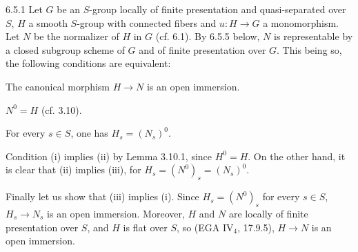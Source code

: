 \begin{proposition}{6.5.1}\label{VIB.6.5.1}
Let $G$ be an $S$-group locally of finite presentation and quasi-separated over $S$, $H$ a smooth $S$-group with connected fibers and $u:H\to G$ a monomorphism. Let $N$ be the normalizer of $H$ in $G$ (cf. 6.1). By 6.5.5 below, $N$ is representable by a closed subgroup scheme of $G$ and of finite presentation over $G$. This being so, the following conditions are equivalent:
\begin{enumeratei}
\item The canonical morphism $H\to N$ is an open immersion.
\item $N^0=H$ (cf. 3.10).
\item For every $s\in S$, one has $H_s=(N_s)^0$.
\end{enumeratei}
\end{proposition}
Condition (i) implies (ii) by Lemma 3.10.1, since $H^0=H$. On the other hand, it is clear that (ii) implies (iii), for $H_s=(N^0)_s=(N_s)^0$.

Finally let us show that (iii) implies (i). Since $H_s=(N^0)_s$ for every $s\in S$, $H_s\to N_s$ is an open immersion. Moreover, $H$ and $N$ are locally of finite presentation over $S$, and $H$ is flat over $S$, so (EGA IV$_4$, 17.9.5), $H\to N$ is an open immersion.


